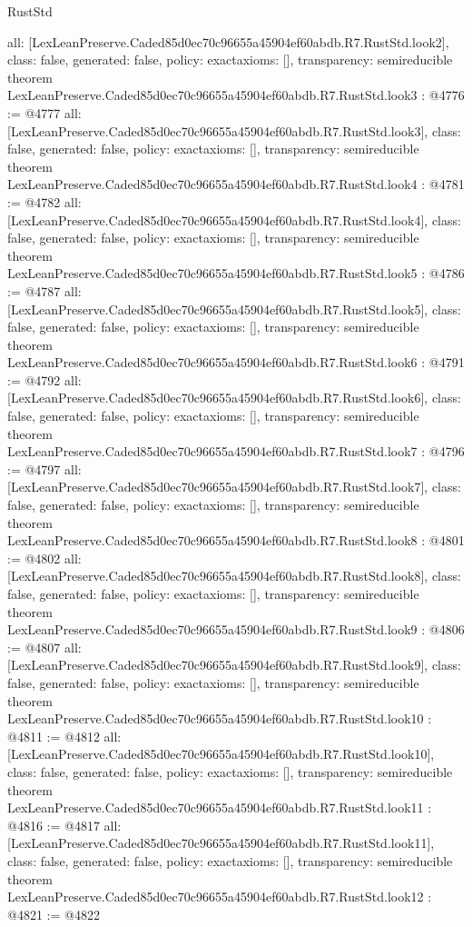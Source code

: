 \begin{lexlean}{RustStd}
\begin{coremodule}
{  all: [LexLeanPreserve.Caded85d0ec70c96655a45904ef60abdb.R7.RustStd.look2],
  class: false,
  generated: false,
  policy: exact{axioms: []},
  transparency: semireducible
}
theorem LexLeanPreserve.Caded85d0ec70c96655a45904ef60abdb.R7.RustStd.look3 : @4776 := @4777 {
  all: [LexLeanPreserve.Caded85d0ec70c96655a45904ef60abdb.R7.RustStd.look3],
  class: false,
  generated: false,
  policy: exact{axioms: []},
  transparency: semireducible
}
theorem LexLeanPreserve.Caded85d0ec70c96655a45904ef60abdb.R7.RustStd.look4 : @4781 := @4782 {
  all: [LexLeanPreserve.Caded85d0ec70c96655a45904ef60abdb.R7.RustStd.look4],
  class: false,
  generated: false,
  policy: exact{axioms: []},
  transparency: semireducible
}
theorem LexLeanPreserve.Caded85d0ec70c96655a45904ef60abdb.R7.RustStd.look5 : @4786 := @4787 {
  all: [LexLeanPreserve.Caded85d0ec70c96655a45904ef60abdb.R7.RustStd.look5],
  class: false,
  generated: false,
  policy: exact{axioms: []},
  transparency: semireducible
}
theorem LexLeanPreserve.Caded85d0ec70c96655a45904ef60abdb.R7.RustStd.look6 : @4791 := @4792 {
  all: [LexLeanPreserve.Caded85d0ec70c96655a45904ef60abdb.R7.RustStd.look6],
  class: false,
  generated: false,
  policy: exact{axioms: []},
  transparency: semireducible
}
theorem LexLeanPreserve.Caded85d0ec70c96655a45904ef60abdb.R7.RustStd.look7 : @4796 := @4797 {
  all: [LexLeanPreserve.Caded85d0ec70c96655a45904ef60abdb.R7.RustStd.look7],
  class: false,
  generated: false,
  policy: exact{axioms: []},
  transparency: semireducible
}
theorem LexLeanPreserve.Caded85d0ec70c96655a45904ef60abdb.R7.RustStd.look8 : @4801 := @4802 {
  all: [LexLeanPreserve.Caded85d0ec70c96655a45904ef60abdb.R7.RustStd.look8],
  class: false,
  generated: false,
  policy: exact{axioms: []},
  transparency: semireducible
}
theorem LexLeanPreserve.Caded85d0ec70c96655a45904ef60abdb.R7.RustStd.look9 : @4806 := @4807 {
  all: [LexLeanPreserve.Caded85d0ec70c96655a45904ef60abdb.R7.RustStd.look9],
  class: false,
  generated: false,
  policy: exact{axioms: []},
  transparency: semireducible
}
theorem LexLeanPreserve.Caded85d0ec70c96655a45904ef60abdb.R7.RustStd.look10 : @4811 := @4812 {
  all: [LexLeanPreserve.Caded85d0ec70c96655a45904ef60abdb.R7.RustStd.look10],
  class: false,
  generated: false,
  policy: exact{axioms: []},
  transparency: semireducible
}
theorem LexLeanPreserve.Caded85d0ec70c96655a45904ef60abdb.R7.RustStd.look11 : @4816 := @4817 {
  all: [LexLeanPreserve.Caded85d0ec70c96655a45904ef60abdb.R7.RustStd.look11],
  class: false,
  generated: false,
  policy: exact{axioms: []},
  transparency: semireducible
}
theorem LexLeanPreserve.Caded85d0ec70c96655a45904ef60abdb.R7.RustStd.look12 : @4821 := @4822 {
}
\end{coremodule}
\end{lexlean}
